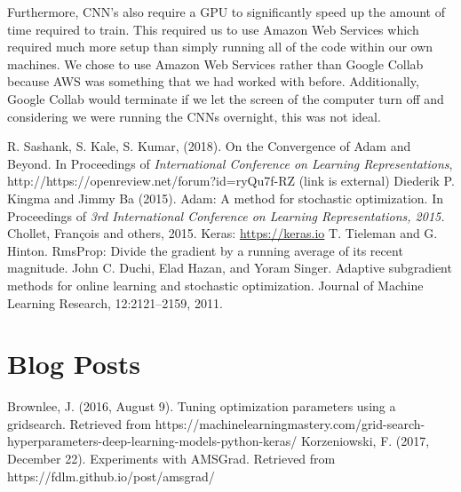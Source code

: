 \documentclass[letterpaper, 10 pt, conference]{ieeeconf}  %
\begin{document}
Furthermore, CNN's also require a GPU to significantly speed up the amount of time required to train. This required us to use Amazon Web Services which required much more setup than simply running all of the code within our own machines. We chose to use Amazon Web Services rather than Google Collab because AWS was something that we had worked with before. Additionally, Google Collab would terminate if we let the screen of the computer turn off and considering we were running the CNNs overnight, this was not ideal. 
\addtolength{\textheight}{-12cm}   %




\begin{thebibliography}{99}
 R. Sashank, S. Kale, S. Kumar, (2018). On the Convergence of Adam and Beyond. In Proceedings of \emph{International Conference on Learning Representations}, http://https://openreview.net/forum?id=ryQu7f-RZ (link is external)
 Diederik P. Kingma and Jimmy Ba (2015). Adam: A method for stochastic optimization. In Proceedings
of \emph{3rd International Conference on Learning Representations, 2015.}
 Chollet, Fran\c{c}ois and others, 2015. Keras: \url{https://keras.io}
 T. Tieleman and G. Hinton. RmsProp: Divide the gradient by a running average of its recent magnitude.
 John C. Duchi, Elad Hazan, and Yoram Singer. Adaptive subgradient methods for online learning
and stochastic optimization. Journal of Machine Learning Research, 12:2121–2159, 2011.

\section*{Blog Posts}

 Brownlee, J. (2016, August 9). Tuning optimization parameters using a gridsearch. Retrieved from https://machinelearningmastery.com/grid-search-hyperparameters-deep-learning-models-python-keras/
 Korzeniowski, F. (2017, December 22). Experiments with AMSGrad. Retrieved from https://fdlm.github.io/post/amsgrad/

\end{thebibliography}
\newpage
\end{document}
